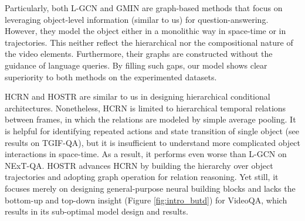 \documentclass[letterpaper]{article} \usepackage{aaai21}  \usepackage{times}  \usepackage{helvet} \usepackage{courier}  \usepackage[hyphens]{url}  \usepackage{graphicx} \urlstyle{rm} \def\UrlFont{\rm}  \usepackage{natbib}  \usepackage{caption} \usepackage{color, colortbl}
\begin{document}
Particularly, both L-GCN and GMIN are graph-based methods that focus on leveraging object-level information (similar to us) for question-answering. However, they model the object either in a monolithic way in space-time or in trajectories. This neither reflect the hierarchical nor the compositional nature of the video elements. Furthermore, their graphs are constructed without the guidance of language queries. By filling such gaps, our model shows clear superiority to both methods on the experimented datasets.
\begin{table}[t!]
\small
\centering
\begin{threeparttable}
\caption{Comparison of accuracy.}
\label{table:gif_result}
\end{threeparttable}
\vspace{-1.0em}
\end{table}

HCRN and HOSTR are similar to us in designing hierarchical conditional architectures. Nonetheless, HCRN is limited to hierarchical temporal relations between frames, in which the relations are modeled by simple average pooling. It is helpful for identifying repeated actions and state transition of single object (see results on TGIF-QA), but it is insufficient to understand more complicated object interactions in space-time. As a result, it performs even worse than L-GCN on NExT-QA. HOSTR advances HCRN by building the hierarchy over object trajectories and adopting graph operation for relation reasoning. Yet still, it focuses merely on designing general-purpose neural building blocks and lacks the bottom-up and top-down insight (Figure \ref{fig:intro_butd}) for VideoQA, which results in its sub-optimal model design and results.
\end{document}
